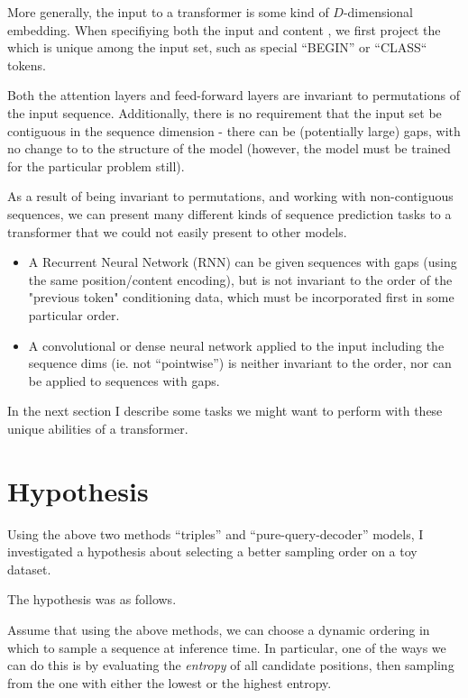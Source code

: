 More generally, the input to a transformer is some kind of $D$-dimensional embedding. When specifiying both the input and content , we first project the which is unique among the input set, such as special ``BEGIN'' or ``CLASS`` tokens.

Both the attention layers and feed-forward layers are invariant to permutations of the input sequence. Additionally, there is no requirement that the input set be contiguous in the sequence dimension - there can be (potentially large) gaps, with no change to to the structure of the model (however, the model must be trained for the particular problem still).

As a result of being invariant to permutations, and working with non-contiguous sequences, we can present many different kinds of sequence prediction tasks to a transformer that we could not easily present to other models.

\begin{itemize}
    \item A Recurrent Neural Network (RNN) can be given sequences with gaps (using the same position/content encoding), but is not invariant to the order of the "previous token" conditioning data, which must be incorporated first in some particular order.
    \item A convolutional or dense neural network applied to the input including the sequence dims (ie. not ``pointwise'') is neither invariant to the order, nor can be applied to sequences with gaps.
\end{itemize}

In the next section I describe some tasks we might want to perform with these unique abilities of a transformer.


\section{Hypothesis}
\label{s:a-o-hypotheses}

Using the above two methods ``triples'' and ``pure-query-decoder'' models, I investigated a hypothesis about selecting a better sampling order on a toy dataset.

The hypothesis was as follows.

Assume that using the above methods, we can choose a dynamic ordering in which to sample a sequence at inference time. In particular, one of the ways we can do this is by evaluating the \textit{entropy} of all candidate positions, then sampling from the one with either the lowest or the highest entropy.

